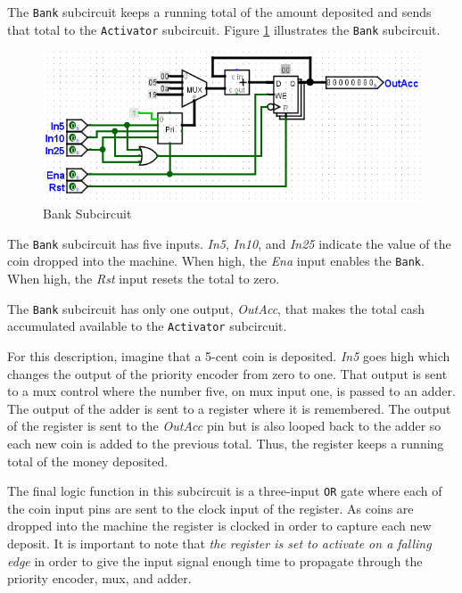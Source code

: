 The \lstinline[columns=fixed]|Bank| subcircuit keeps a running total of the amount deposited and sends that total to the \lstinline[columns=fixed]|Activator| subcircuit. Figure \ref{fig:05-03} illustrates the \lstinline[columns=fixed]|Bank| subcircuit.

\begin{figure}[H]
	\centering
	\includegraphics[width=\maxwidth{.95\linewidth}]{gfx/05-03}
	\caption{Bank Subcircuit}
	\label{fig:05-03}
\end{figure}

The \lstinline[columns=fixed]|Bank| subcircuit has five inputs. \textit{In5}, \textit{In10}, and \textit{In25} indicate the value of the coin dropped into the machine. When high, the \textit{Ena} input enables the \lstinline[columns=fixed]|Bank|. When high, the \textit{Rst} input resets the total to zero.

The \lstinline[columns=fixed]|Bank| subcircuit has only one output, \textit{OutAcc}, that makes the total cash accumulated available to the \lstinline[columns=fixed]|Activator| subcircuit.

For this description, imagine that a 5-cent coin is deposited. \textit{In5} goes high which changes the output of the priority encoder from zero to one. That output is sent to a mux control where the number five, on mux input one, is passed to an adder. The output of the adder is sent to a register where it is remembered. The output of the register is sent to the \textit{OutAcc} pin but is also looped back to the adder so each new coin is added to the previous total. Thus, the register keeps a running total of the money deposited.

The final logic function in this subcircuit is a three-input \texttt{OR} gate where each of the coin input pins are sent to the clock input of the register. As coins are dropped into the machine the register is clocked in order to capture each new deposit. It is important to note that \textit{the register is set to activate on a falling edge} in order to give the input signal enough time to propagate through the priority encoder, mux, and adder.

